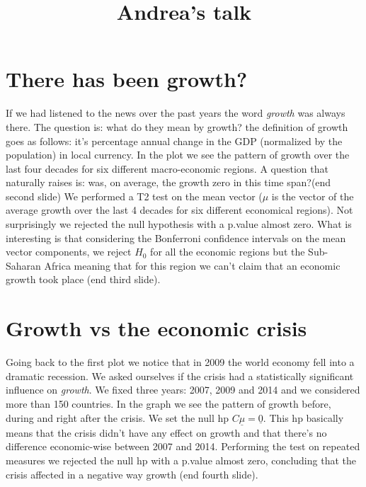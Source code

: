 \documentclass[12pt,twoside,a4paper]{article}
\begin{document}
	\title{Andrea's talk}
	\date{}
	\maketitle
	
	\section{There has been growth?}
	If we had listened to the news over the past years the word \textit{growth} was always there.
	The question is: what do they mean by growth?
	the definition of growth goes as follows: it's percentage annual change in the GDP (normalized by the population) in local currency.
	\newline
	In the plot we see the pattern of growth over the last four decades for six different macro-economic regions. A question that naturally raises is: was, on average, the growth zero in this time span?(end second slide) \newline
	We performed a T2 test on the mean vector ($\mu$ is the vector of the average growth over the last 4 decades for six different economical regions). Not surprisingly we rejected the null hypothesis with a p.value almost zero. What is interesting is that considering the Bonferroni confidence intervals on the mean vector components, we reject $H_0$ for all the economic regions but the Sub-Saharan Africa meaning that for this region we can't claim that an economic growth took place (end third slide).\newline
	
	\section{Growth vs the economic crisis}
	Going back to the first plot we notice that in 2009 the world economy fell into a dramatic recession. We asked ourselves if the crisis had a statistically significant influence on \textit{growth}. We fixed three years: 2007, 2009 and 2014 and we considered more than 150 countries. In the graph we see the pattern of growth before, during and right after the crisis. We set the null hp $ C\underline{\mu} = \underline{0} $. This hp basically means that the crisis didn't have any effect on growth and that there's no difference economic-wise between 2007 and 2014.
	Performing the test on repeated measures we rejected the null hp with a p.value almost zero, concluding that the crisis affected in a negative way growth (end fourth slide).\newline
	
\end{document}
